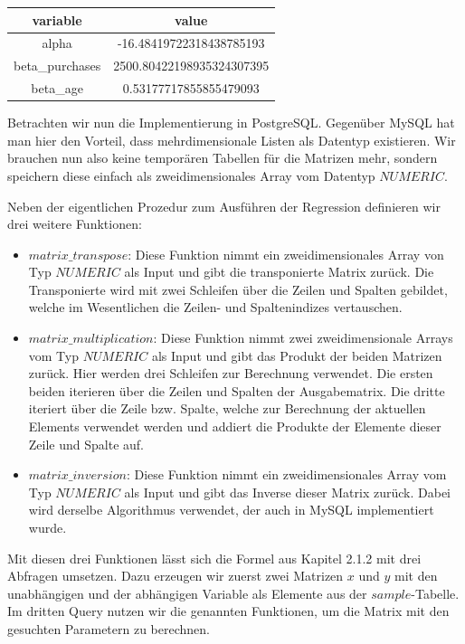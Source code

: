 \begin{center}
  \begin{tabular}{|c|c|}\hline
    \textbf{variable} & \textbf{value} \\ \hline
    alpha & -16.48419722318438785193 \\ \hline
    beta\_purchases & 2500.80422198935324307395 \\ \hline
    beta\_age & 0.53177717855855479093 \\ \hline
  \end{tabular}
\end{center}

Betrachten wir nun die Implementierung in PostgreSQL. Gegenüber MySQL hat man hier den Vorteil, dass mehrdimensionale Listen als Datentyp existieren. Wir brauchen nun also keine temporären Tabellen für die Matrizen mehr, sondern speichern diese einfach als zweidimensionales Array vom Datentyp $NUMERIC$.

Neben der eigentlichen Prozedur zum Ausführen der Regression definieren wir drei weitere Funktionen:
\begin{itemize}
  \item $matrix\_transpose$: Diese Funktion nimmt ein zweidimensionales Array von Typ $NUMERIC$ als Input und gibt die transponierte Matrix zurück. Die Transponierte wird mit zwei Schleifen über die Zeilen und Spalten gebildet, welche im Wesentlichen die Zeilen- und Spaltenindizes vertauschen.
  \item $matrix\_multiplication$: Diese Funktion nimmt zwei zweidimensionale Arrays vom Typ $NUMERIC$ als Input und gibt das Produkt der beiden Matrizen zurück. Hier werden drei Schleifen zur Berechnung verwendet. Die ersten beiden iterieren über die Zeilen und Spalten der Ausgabematrix. Die dritte iteriert über die Zeile bzw. Spalte, welche zur Berechnung der aktuellen Elements verwendet werden und addiert die Produkte der Elemente dieser Zeile und Spalte auf.
  \item $matrix\_inversion$: Diese Funktion nimmt ein zweidimensionales Array vom Typ $NUMERIC$ als Input und gibt das Inverse dieser Matrix zurück. Dabei wird derselbe Algorithmus verwendet, der auch in MySQL implementiert wurde.
\end{itemize}

Mit diesen drei Funktionen lässt sich die Formel aus Kapitel 2.1.2 mit drei Abfragen umsetzen. Dazu erzeugen wir zuerst zwei Matrizen $x$ und $y$ mit den unabhängigen und der abhängigen Variable als Elemente aus der $sample$-Tabelle. Im dritten Query nutzen wir die genannten Funktionen, um die Matrix mit den gesuchten Parametern zu berechnen.


